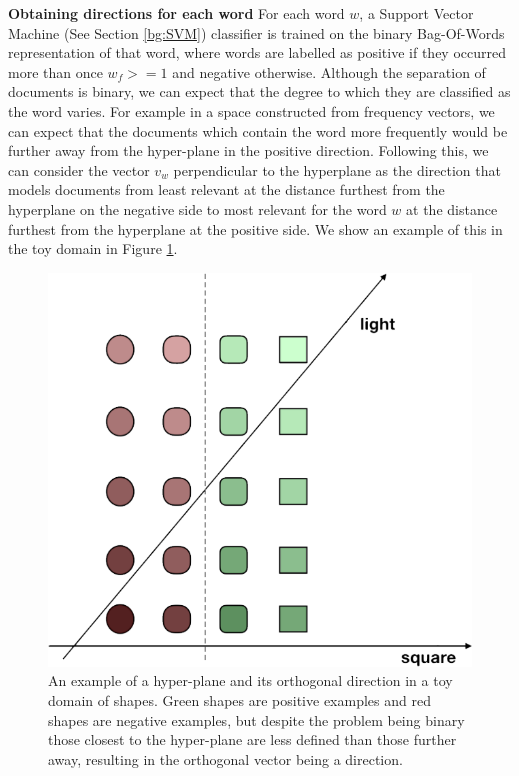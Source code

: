 \noindent \textbf{Obtaining directions for each word} For each word $w$, a Support Vector Machine (See Section \ref{bg:SVM}) classifier is trained on the binary Bag-Of-Words representation of that word, where words are labelled as positive if they occurred more than once $w_f >= 1$ and negative otherwise. Although the separation of documents is binary, we can expect that the degree to which they are classified as the word varies. For example in a space constructed from frequency vectors, we can expect that the documents which contain the word more frequently would be further away from the hyper-plane in the positive direction. Following this, we can consider the vector $v_w$ perpendicular to the hyperplane as the direction that models documents from least relevant at the distance furthest from the hyperplane on the negative side to most relevant for the word $w$ at the distance furthest from the hyperplane at the positive side. We show an example of this in the toy domain in Figure \ref{ch3:ToyHyperPlane}. %


\begin{figure}[t]
	\includegraphics[width=\textwidth]{images/ToyHyperplane.png}
	\centering
	\caption{An example of a hyper-plane and its orthogonal direction in a toy domain of shapes. Green shapes are positive examples and red shapes are negative examples, but despite the problem being binary those closest to the hyper-plane are less defined than those further away, resulting in the orthogonal vector being a direction.}\label{ch3:ToyHyperPlane}
\end{figure}




